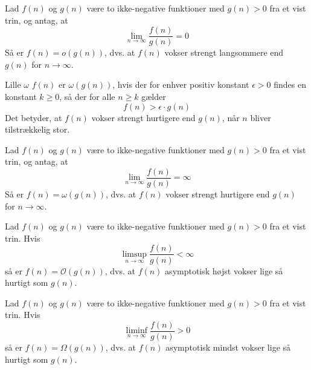 \begin{proposition}
    Lad \( f(n) \) og \( g(n) \) være to ikke-negative funktioner med $g(n)>0$ fra et vist trin, og antag, at
    \medskip
    \[
    \lim_{n \rightarrow \infty} \frac{f(n)}{g(n)} = 0
    \]
    \medskip
    Så er \( f(n) = o(g(n)) \), dvs. at \( f(n) \) vokser strengt langsommere end \( g(n) \) for \( n \to \infty \).
\end{proposition}

\begin{definition}{Lille $\omega$}
    $f(n)$ er $\omega(g(n))$, hvis der for enhver positiv konstant $\epsilon > 0$ findes en konstant $k \geq 0$, så der for alle $n \geq k$ gælder
    \medskip
    \[
    f(n) > \epsilon \cdot g(n)
    \]
    \medskip
    Det betyder, at $f(n)$ vokser strengt hurtigere end $g(n)$, når $n$ bliver tilstrækkelig stor.
\end{definition}

\begin{proposition}
    Lad \( f(n) \) og \( g(n) \) være to ikke-negative funktioner med $g(n)>0$ fra et vist trin, og antag, at
    \medskip
    \[
    \lim_{n \rightarrow \infty} \frac{f(n)}{g(n)} = \infty
    \]
    \medskip
    Så er \( f(n) = \omega(g(n)) \), dvs. at \( f(n) \) vokser strengt hurtigere end \( g(n) \) for \( n \to \infty \).
\end{proposition}

        \begin{proposition}
            Lad \( f(n) \) og \( g(n) \) være to ikke-negative funktioner med $g(n)>0$ fra et vist trin. Hvis
            \medskip
            \[
            \limsup_{n \rightarrow \infty} \frac{f(n)}{g(n)} < \infty
            \]
            \medskip
            så er \( f(n) = \mathcal{O}(g(n)) \), dvs. at \( f(n) \) asymptotisk højst vokser lige så hurtigt som \( g(n) \).
        \end{proposition}

        \begin{proposition}
            Lad \( f(n) \) og \( g(n) \) være to ikke-negative funktioner med $g(n)>0$ fra et vist trin. Hvis
            \medskip
            \[
            \liminf_{n \rightarrow \infty} \frac{f(n)}{g(n)} > 0
            \]
            \medskip
            så er \( f(n) = \Omega(g(n)) \), dvs. at \( f(n) \) asymptotisk mindst vokser lige så hurtigt som \( g(n) \).
        \end{proposition}

